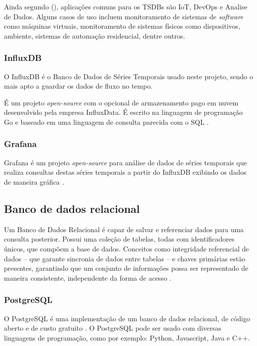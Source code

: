 Ainda segundo \citeauthor{Noor2017} (\citeyear{Noor2017}), aplicações comuns para os TSDBs são IoT, DevOps e Analise de Dados. Alguns casos de uso incluem monitoramento de sistemas de \textit{software} como máquinas virtuais, monitoramento de sistemas físicos como dispositivos, ambiente, sistemas de automação residencial, dentre outros.

\subsubsection{InfluxDB}

O InfluxDB é o Banco de Dados de Séries Temporais usado neste projeto, sendo o mais apto a guardar os dados de fluxo no tempo. \cite{Lundrigan2017}

É um projeto \textit{open-source} com o opcional de armazenamento pago em nuvem desenvolvido pela empresa InfluxData. É escrito na linguagem de programação Go e baseado em uma linguagem de consulta parecida com o SQL \cite{Noor2017}.

\subsubsection{Grafana}

Grafana é um projeto \textit{open-source} para análise de dados de séries temporais  \cite{Noor2017} que realiza consultas destas séries temporais a partir do InfluxDB exibindo os dados de maneira gráfica \cite{chang2017kubernetes}.

\subsection{Banco de dados relacional}

Um Banco de Dados Relacional é capaz de salvar e referenciar dados para uma consulta posterior. Possui uma coleção de tabelas, todas com identificadores únicos, que compõem a base de
dados. Conceitos como integridade referencial de dados – que garante sincronia de dados entre tabelas – e chaves primárias estão presentes, garantindo que um conjunto de informações possa ser representado de maneira consistente, independente da forma de acesso  \cite{bancosrelacionais}.

\subsubsection{PostgreSQL}

O PostgreSQL é uma implementação de um banco de dados relacional, de código aberto e de custo gratuito \cite{stones2006beginning}. O 
PostgreSQL pode ser usado com diversas linguagens de programação, como por exemplo: Python, Javascript, Java e C++.

